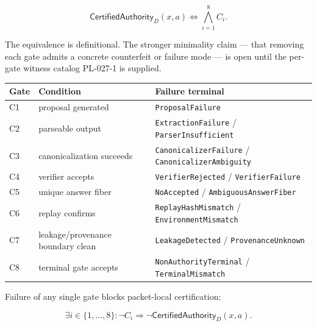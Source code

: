\documentclass[
  10pt,
]{article}
\DeclareRobustCommand{\texttt}[1]{{\paperSymbolFont\nolinkurl{#1}}}
\begin{document}
\protect\hypertarget{math-E0096-0123}{}{\[
\boxed{
\mathsf{CertifiedAuthority}_D(x,a)
\iff
\bigwedge_{i=1}^{8} C_i.
}
\]}

The equivalence is definitional. The stronger minimality claim --- that removing each gate admits a concrete counterfeit or failure mode --- is open until the per-gate witness catalog PL-027-1 is supplied.

\begin{longtable}[]{@{}
  >{\raggedright\arraybackslash}p{}
  >{\raggedright\arraybackslash}p{}
  >{\raggedright\arraybackslash}p{}@{}}
\toprule\noalign{}
\begin{minipage}[b]{\linewidth}\raggedright
Gate
\end{minipage} & \begin{minipage}[b]{\linewidth}\raggedright
Condition
\end{minipage} & \begin{minipage}[b]{\linewidth}\raggedright
Failure terminal
\end{minipage} \\
\midrule\noalign{}
\endhead
\bottomrule\noalign{}
\endlastfoot
C1 & proposal generated & \texttt{ProposalFailure} \\
C2 & parseable output & \texttt{ExtractionFailure} / \texttt{ParserInsufficient} \\
C3 & canonicalization succeeds & \texttt{CanonicalizerFailure} / \texttt{CanonicalizerAmbiguity} \\
C4 & verifier accepts & \texttt{VerifierRejected} / \texttt{VerifierFailure} \\
C5 & unique answer fiber & \texttt{NoAccepted} / \texttt{AmbiguousAnswerFiber} \\
C6 & replay confirms & \texttt{ReplayHashMismatch} / \texttt{EnvironmentMismatch} \\
C7 & leakage/provenance boundary clean & \texttt{LeakageDetected} / \texttt{ProvenanceUnknown} \\
C8 & terminal gate accepts & \texttt{NonAuthorityTerminal} / \texttt{TerminalMismatch} \\
\end{longtable}

Failure of any single gate blocks packet-local certification:

\protect\hypertarget{math-E0097-0124}{}{\[
\exists i\in\{1,\dots,8\}:\neg C_i
\Rightarrow
\neg\mathsf{CertifiedAuthority}_D(x,a).
\]}
\end{document}
